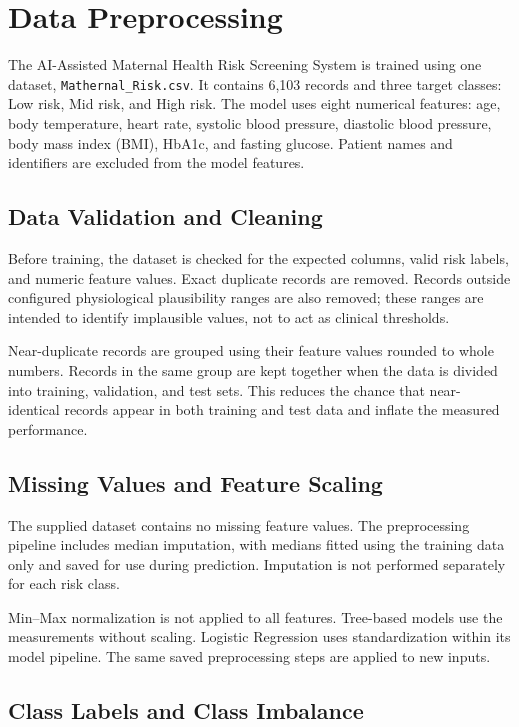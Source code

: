 \section{Data Preprocessing}

The AI-Assisted Maternal Health Risk Screening System is trained using one
dataset, \texttt{Mathernal\_Risk.csv}. It contains 6,103 records and three
target classes: Low risk, Mid risk, and High risk. The model uses eight
numerical features: age, body temperature, heart rate, systolic blood
pressure, diastolic blood pressure, body mass index (BMI), HbA1c, and
fasting glucose. Patient names and identifiers are excluded from the model
features.

\subsection{Data Validation and Cleaning}

Before training, the dataset is checked for the expected columns, valid
risk labels, and numeric feature values. Exact duplicate records are
removed. Records outside configured physiological plausibility ranges are
also removed; these ranges are intended to identify implausible values,
not to act as clinical thresholds.

Near-duplicate records are grouped using their feature values rounded to
whole numbers. Records in the same group are kept together when the data
is divided into training, validation, and test sets. This reduces the
chance that near-identical records appear in both training and test data
and inflate the measured performance.

\subsection{Missing Values and Feature Scaling}

The supplied dataset contains no missing feature values. The preprocessing
pipeline includes median imputation, with medians fitted using the training
data only and saved for use during prediction. Imputation is not performed
separately for each risk class.

Min--Max normalization is not applied to all features. Tree-based models
use the measurements without scaling. Logistic Regression uses
standardization within its model pipeline. The same saved preprocessing
steps are applied to new inputs.

\subsection{Class Labels and Class Imbalance}

